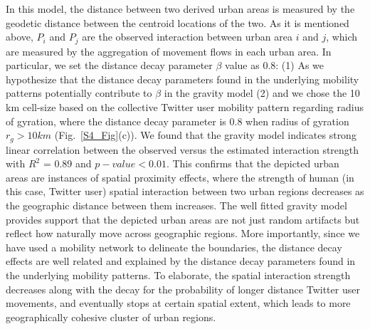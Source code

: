 \documentclass[]{tGIS2e}
\begin{document}
In this model, the distance between two derived urban areas is measured by the geodetic distance between the centroid locations of the two.
As it is mentioned above,  $P_{i}$ and $P_{j}$  are the observed interaction between urban area $i$ and $j$, which are measured by the aggregation of movement flows in each urban area.
In particular, we set the distance decay parameter $\beta$ value as 0.8: (1) As we hypothesize that the distance decay parameters found in the underlying mobility patterns potentially contribute to $\beta$ in the gravity model (2) and we chose the 10 km cell-size based on the collective Twitter user mobility pattern regarding radius of gyration, where the distance decay parameter is 0.8 when radius of gyration $r_{g} > 10 km$ (Fig.~\ref{S4_Fig}(c)).
We found that the gravity model indicates strong linear correlation between the observed versus the estimated interaction strength with $R^{2}$ = 0.89 and $p-value < 0.01$.
This confirms that the depicted urban areas are instances of spatial proximity effects, where the strength of human (in this case, Twitter user) spatial interaction between two urban regions decreases as the geographic distance between them increases. 
The well fitted gravity model provides support that the depicted urban areas are not just random artifacts but reflect how naturally move across geographic regions.
More importantly, since we have used a mobility network to delineate the boundaries, the distance decay effects are well related and explained by the distance decay parameters found in the underlying mobility patterns.
To elaborate, the spatial interaction strength decreases along with the decay for the probability of longer distance Twitter user movements, and eventually stops at certain spatial extent, which leads to more geographically cohesive cluster of urban regions.
\end{document}
